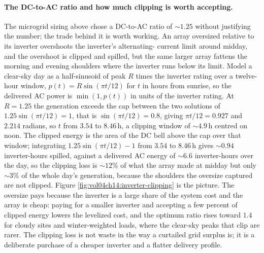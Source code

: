 \paragraph{The DC-to-AC ratio and how much clipping is worth accepting.}
The microgrid sizing above chose a DC-to-AC ratio of $\sim 1.25$ without
justifying the number; the trade behind it is worth working. An array
oversized relative to its inverter overshoots the inverter's alternating-
current limit around midday, and the overshoot is clipped and spilled, but
the same larger array fattens the morning and evening shoulders where the
inverter runs below its limit. Model a clear-sky day as a half-sinusoid of
peak $R$ times the inverter rating over a twelve-hour window,
$p(t) = R\sin(\pi t/12)$ for $t$ in hours from sunrise, so the delivered AC
power is $\min(1, p(t))$ in units of the inverter rating. At $R = 1.25$ the
generation exceeds the cap between the two solutions of $1.25\sin(\pi t/12) =
1$, that is $\sin(\pi t/12) = 0.8$, giving $\pi t/12 = 0.927$ and $2.214$
radians, so $t$ from $3.54$ to $8.46\,\si{\hour}$, a clipping window of
$\sim 4.9\,\si{\hour}$ centred on noon. The clipped energy is the area of the
DC bell above the cap over that window; integrating $1.25\sin(\pi t/12) - 1$
from $3.54$ to $8.46\,\si{\hour}$ gives $\sim 0.94$ inverter-hours spilled,
against a delivered AC energy of $\sim 6.6$ inverter-hours over the day, so
the clipping loss is $\sim 12\%$ of what the array made at midday but only
$\sim 3\%$ of the whole day's generation, because the shoulders the oversize
captured are not clipped. Figure \ref{fig:vol04ch14:inverter-clipping} is the
picture. The oversize pays because the inverter is a large share of the
system cost and the array is cheap: paying for a smaller inverter and
accepting a few percent of clipped energy lowers the levelized cost, and the
optimum ratio rises toward $1.4$ for cloudy sites and winter-weighted loads,
where the clear-sky peaks that clip are rarer. The clipping loss is not
waste in the way a curtailed grid surplus is; it is a deliberate purchase of
a cheaper inverter and a flatter delivery profile.



